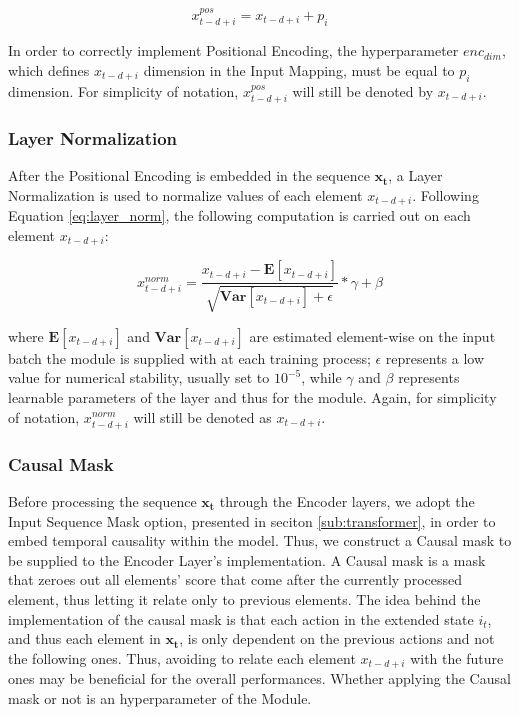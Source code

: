                 \[ x_{t-d+i}^{pos} = x_{t-d+i} + p_i \]
                
                In order to correctly implement Positional Encoding, the hyperparameter $enc_{dim}$, which defines $x_{t-d+i}$ dimension in the Input Mapping, must be equal to $p_i$ dimension. For simplicity of notation, $x_{t-d+i}^{pos}$ will still be denoted by $x_{t-d+i}$.
                
            \subsubsection{Layer Normalization}
                After the Positional Encoding is embedded in the sequence $\mathbf{x_t}$, a Layer Normalization is used to normalize values of each element $x_{t-d+i}$. Following Equation \ref{eq:layer_norm}, the following computation is carried out on each element $x_{t-d+i}$:
                
                \[ x^{norm}_{t-d+i} = \frac{x_{t-d+i} - \mathbf{E} \left[ x_{t-d+i} \right]}{\sqrt{\mathbf{Var} \left[ x_{t-d+i} \right] + \epsilon}} * \gamma + \beta\]
                
                where $\mathbf{E} \left[ x_{t-d+i} \right]$ and $\mathbf{Var} \left[ x_{t-d+i} \right]$ are estimated element-wise on the input batch the module is supplied with at each training process; $\epsilon$ represents a low value for numerical stability, usually set to $10^{-5}$, while $\gamma$ and $\beta$ represents learnable parameters of the layer and thus for the module. Again, for simplicity of notation, $x^{norm}_{t-d+i}$ will still be denoted as $x_{t-d+i}$.
                
            \subsubsection{Causal Mask}
                Before processing the sequence $\mathbf{x_t}$ through the Encoder layers, we adopt the Input Sequence Mask option, presented in seciton \ref{sub:transformer}, in order to embed temporal causality within the model. Thus, we construct a Causal mask to be supplied to the Encoder Layer's implementation. A Causal mask is a mask that zeroes out all elements' score that come after the currently processed element, thus letting it relate only to previous elements. \newline
                The idea behind the implementation of the causal mask is that each action in the extended state $i_t$, and thus each element in $\mathbf{x_t}$, is only dependent on the previous actions and not the following ones. Thus, avoiding to relate each element $x_{t-d+i}$ with the future ones may be beneficial for the overall performances. Whether applying the Causal mask or not is an hyperparameter of the Module.
                

